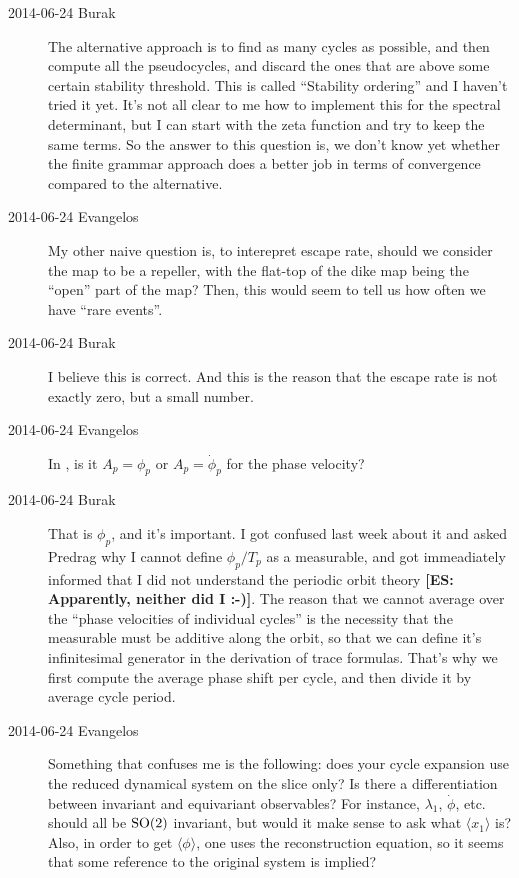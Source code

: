 \begin{description}
\item[2014-06-24 Burak] The alternative approach is to find as many cycles as possible,
and then compute all the pseudocycles, and discard the ones that are above some
certain stability threshold. This is called ``Stability ordering'' and I haven't
tried it yet. It's not all clear to me how to implement this for the spectral 
determinant, but I can start with the zeta function and try to keep the same terms.
So the answer to this question is, we don't know yet whether the finite grammar 
approach does a better job in terms of convergence compared to the alternative.

\item[2014-06-24 Evangelos] My other naive question is, to interepret escape rate, should we 
consider the map to be a repeller, with the flat-top of the dike map being the ``open'' part
of the map? Then, this would seem to tell us how often we have ``rare events''.

\item[2014-06-24 Burak] I believe this is correct. And this is the reason that
the escape rate is not exactly zero, but a small number.

\item[2014-06-24 Evangelos] In , is it $A_p = \phi_p$ or $A_p = \dot{\phi}_p$ for
the phase velocity?

\item[2014-06-24 Burak] That is $\phi_p$, and it's important. I got confused last
week about it and asked Predrag why I cannot define $\phi_p / T_p$ as a measurable, 
and got immeadiately informed that I did not understand the periodic orbit
theory {\bf [ES: Apparently, neither did I :-)]}. The reason that we cannot average over the ``phase velocities of 
individual cycles'' is the necessity that the measurable must be additive along
the orbit, so that we can define it's infinitesimal generator in the derivation 
of trace formulas. That's why we first compute the average phase shift per cycle, 
and then divide it by average cycle period.

\item[2014-06-24 Evangelos] Something that confuses me is the following: does your cycle expansion 
use the reduced dynamical system on the slice only? Is there a differentiation between invariant 
and equivariant observables? For instance, $\lambda_1$, $\dot{\phi}$, etc. should all be $\textrm{SO}(2)$
invariant, but would it make sense to ask what $\langle x_1\rangle$ is? Also, in order to get
$\langle \phi \rangle$, one uses the reconstruction equation, so it seems that some
reference to the original system is implied?


\end{description}
